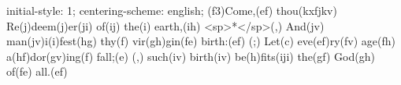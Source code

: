 initial-style: 1;
centering-scheme: english;
(f3)Come,(ef) thou(kxfjkv) Re(j)deem(j)er(ji) of(ij) the(i) earth,(ih) <sp>*</sp>(,)
And(jv) man(jv)i(i)fest(hg) thy(f) vir(gh)gin(fe) birth:(ef) (;)
Let(c) eve(ef)ry(fv) age(fh) a(hf)dor(gv)ing(f) fall;(e) (,)
such(iv) birth(iv) be(h)fits(iji) the(gf) God(gh) of(fe) all.(ef)
